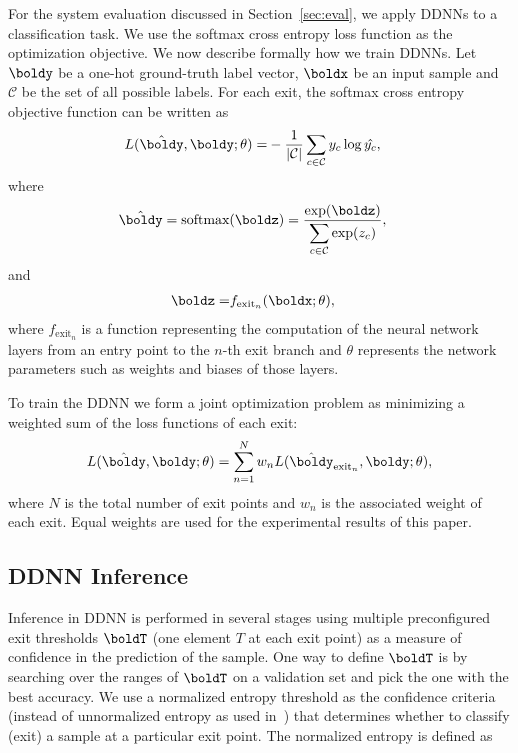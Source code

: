 \documentclass[10pt, conference, compsocconf]{IEEEtran}
\newcommand{\eg}{\emph{e.g.}}
\begin{document}
For the system evaluation discussed in Section~\ref{sec:eval}, we apply DDNNs to a classification task. We use the softmax cross entropy loss function as the optimization objective. We now describe formally how we train DDNNs. Let $\boldy$ be a one-hot ground-truth label vector, $\boldx$ be an input sample and $\mathcal C$ be the set of all possible labels. For each exit, the softmax cross entropy objective function can be written as
\begin{align*}
L(\hat{\boldy}, \boldy;\theta) = 
&-\frac{1}{|\mathcal C|} \displaystyle \sum_{c\in \mathcal C} y_c \log \hat{y_c},
\end{align*}
where 
\begin{align*}
\hat{\boldy}
&= \text{softmax}(\boldz) 
= \frac{\exp(\boldz)}{\displaystyle \sum_{c\in \mathcal C} \exp(z_c)},
\end{align*}
and
\begin{align*}
\boldz =
& f_{\text{exit}_n}(\boldx;\theta),
\end{align*}
where $f_{\text{exit}_n}$ is a function representing the computation of the neural network layers from an entry point to the $n$-th exit branch and $\theta$ represents the network parameters such as weights and biases of those layers.

To train the DDNN we form a joint optimization problem as minimizing a weighted sum of the loss functions of each exit:
\begin{align*}
    L(\hat{\boldy}, \boldy;\theta) = \displaystyle \sum_{n=1}^N w_n L(\hat{\boldy}_{\text{exit}_n}, \boldy;\theta),
\end{align*}
where $N$ is the total number of exit points and $w_n$ is the associated weight of each exit. Equal weights are used for the experimental results of this paper. %

\subsection{DDNN Inference}

Inference in DDNN is performed in several stages using multiple preconfigured exit thresholds $\boldT$ (one element $T$ at each exit point) as a measure of confidence in the prediction of the sample. One way to define $\boldT$ is by searching over the ranges of $\boldT$ on a validation set and pick the one with the best accuracy. We use a normalized entropy threshold as the confidence criteria (instead of unnormalized entropy as used in~\cite{teerapittayanon2016branchynet}) that determines whether to classify (exit) a sample at a particular exit point. The normalized entropy is defined as
\end{document}
